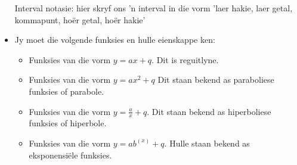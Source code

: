 \begin{itemize}[noitemsep]
Interval notasie: hier skryf ons ’n interval in die vorm ’laer hakie, laer getal, kommapunt, hoër getal, hoër
hakie’
\item  Jy moet die volgende funksies en hulle eienskappe ken:
    \begin{itemize}[noitemsep]
    \item Funksies van die vorm $y=ax+q$. Dit is reguitlyne.
    \item Funksies van die vorm $y=a{x}^{2}+q$ Dit staan bekend as paraboliese funksies of parabole.
    \item Funksies van die vorm $y=\frac{a}{x}+q$. Dit staan bekend as hiperboliese funksies of hiperbole.
    \item Funksies van die vorm $y=a{b}^{(x)}+q$. Hulle staan bekend as eksponensiële funksies.
    \end{itemize}
\end{itemize}

